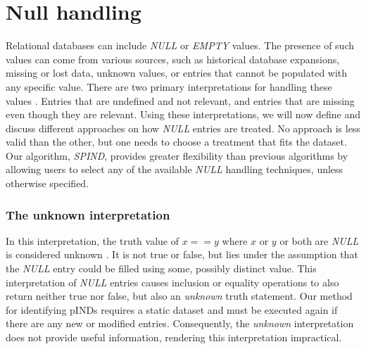 \section{Null handling} \label{sec:null_handling}


Relational databases can include \textit{NULL} or \textit{EMPTY} values.
The presence of such values can come from various sources, such as historical database expansions, missing or lost data, unknown values, or entries that cannot be populated with any specific value. There are two primary interpretations for handling these values \cite{vassiliou1979null}.
Entries that are undefined and not relevant, and entries that are missing even though they are relevant. Using these interpretations, we will now define and discuss different approaches on how \textit{NULL} entries are treated. No approach is less valid than the other, but one needs to choose a treatment that fits the dataset. Our algorithm, \textit{SPIND}, provides greater flexibility than previous algorithms by allowing users to select any of the available \textit{NULL} handling techniques, unless otherwise specified.

\subsubsection{The \textbf{unknown} interpretation}
In this interpretation, the truth value of $x == y$ where $x$ or $y$ or both are \textit{NULL} is considered unknown \cite{codd1979extending}. It is not true or false, but lies under the assumption that the \textit{NULL} entry could be filled using some, possibly distinct value. This interpretation of \textit{NULL} entries causes inclusion or equality operations to also return neither true nor false, but also an \textit{unknown} truth statement. Our method for identifying pINDs requires a static dataset and must be executed again if there are any new or modified entries. Consequently, the \textit{unknown} interpretation does not provide useful information, rendering this interpretation impractical.

